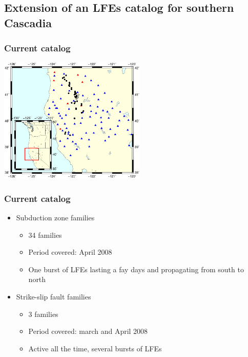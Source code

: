 \documentclass{beamer}
\begin{document}

	\subsection{Extension of an LFEs catalog for southern Cascadia}
	
	\begin{frame}
		\frametitle{Current catalog}
		\begin{center}
			\includegraphics[trim={1cm 3cm 1cm 8cm}, clip, width=7cm]{catalog/families_map.eps}
		\end{center}
	\end{frame}

	\begin{frame}
		\frametitle{Current catalog}
		\begin{itemize}
			\item Subduction zone families
			\begin{itemize}
				\item 34 families
				\item Period covered: April 2008
				\item One burst of LFEs lasting a fay days and propagating from south to north
			\end{itemize}
			\item Strike-slip fault families
			\begin{itemize}
				\item 3 families
				\item Period covered: march and April 2008
				\item Active all the time, several bursts of LFEs
			\end{itemize}
		\end{itemize}
	\end{frame}
\end{document}
